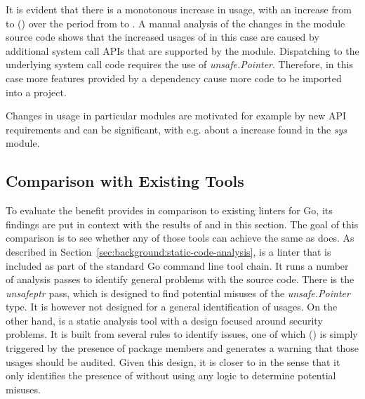 

It is evident that there is a monotonous increase in \unsafe{} usage, with an increase from \sysModuleLeastUnsafe{} to
\sysModuleMostUnsafe{} (\sysModuleUnsafeIncrease) over the  period from  to
.
A manual analysis of the changes in the module source code shows that the increased usages of \unsafe{} in this case are
caused by additional system call \acrshort{API}s that are supported by the module.
Dispatching to the underlying system call code requires the use of \textit{unsafe.Pointer}.
Therefore, in this case more features provided by a dependency cause more \unsafe{} code to be imported into a project.

\begin{tcolorbox}[boxsep=3pt, enlarge top by=5pt, title=Answer to~\ref{rq:changeTime}]
    Changes in \unsafe{} usage in particular modules are motivated for example by new \acrshort{API} requirements and
    can be significant, with e.g. about a \sysModuleUnsafeIncreaseRounded{} increase found in the
    \textit{sys} module.
\end{tcolorbox}



\subsection{Comparison with Existing Tools}\label{subsec:go-geiger:evaluation:linters-comparison}

To evaluate the benefit \toolGeiger{} provides in comparison to existing linters for Go, its findings are put in context
with the results of \toolVet{} and \toolGosec{} in this section.
The goal of this comparison is to see whether any of those tools can achieve the same as \toolGeiger{} does.
As described in Section~\ref{sec:background:static-code-analysis}, \toolVet{} is a linter that is included as part of
the standard Go command line tool chain.
It runs a number of analysis passes to identify general problems with the source code.
There is the \textit{unsafeptr} pass, which is designed to find potential misuses of the \textit{unsafe.Pointer} type.
It is however not designed for a general identification of \unsafe{} usages.
On the other hand, \toolGosec{} is a static analysis tool with a design focused around security problems.
It is built from several rules to identify issues, one of which (\textit{}) is simply triggered by the
presence of \unsafe{} package members and generates a warning that those usages should be audited.
Given this design, it is closer to \toolGeiger{} in the sense that it only identifies the presence of \unsafe{} without
using any logic to determine potential misuses.

